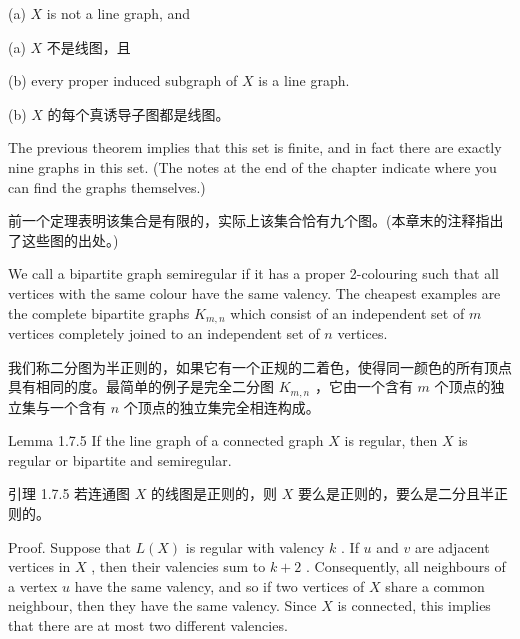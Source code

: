 \documentclass[10pt]{article}
\begin{document}
(a) \(X\) is not a line graph, and

\begin{tcolorbox}\relax
(a) \(X\) 不是线图，且
\end{tcolorbox}

(b) every proper induced subgraph of \(X\) is a line graph.

\begin{tcolorbox}\relax
(b) \(X\) 的每个真诱导子图都是线图。
\end{tcolorbox}

The previous theorem implies that this set is finite, and in fact there are exactly nine graphs in this set. (The notes at the end of the chapter indicate where you can find the graphs themselves.)

\begin{tcolorbox}\relax
前一个定理表明该集合是有限的，实际上该集合恰有九个图。(本章末的注释指出了这些图的出处。)
\end{tcolorbox}

We call a bipartite graph semiregular if it has a proper 2-colouring such that all vertices with the same colour have the same valency. The cheapest examples are the complete bipartite graphs \({K}_{m,n}\) which consist of an independent set of \(m\) vertices completely joined to an independent set of \(n\) vertices.

\begin{tcolorbox}\relax
我们称二分图为半正则的，如果它有一个正规的二着色，使得同一颜色的所有顶点具有相同的度。最简单的例子是完全二分图 \({K}_{m,n}\) ，它由一个含有 \(m\) 个顶点的独立集与一个含有 \(n\) 个顶点的独立集完全相连构成。
\end{tcolorbox}

Lemma 1.7.5 If the line graph of a connected graph \(X\) is regular, then \(X\) is regular or bipartite and semiregular.

\begin{tcolorbox}\relax
引理 1.7.5 若连通图 \(X\) 的线图是正则的，则 \(X\) 要么是正则的，要么是二分且半正则的。
\end{tcolorbox}

Proof. Suppose that \(L\left( X\right)\) is regular with valency \(k\) . If \(u\) and \(v\) are adjacent vertices in \(X\) , then their valencies sum to \(k + 2\) . Consequently, all neighbours of a vertex \(u\) have the same valency, and so if two vertices of \(X\) share a common neighbour, then they have the same valency. Since \(X\) is connected, this implies that there are at most two different valencies.
\end{document}
